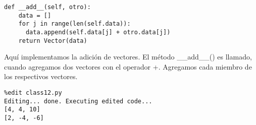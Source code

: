 \documentclass[twoside,10.5pt]{article}%
\begin{document}
\begin{verbatim}
def __add__(self, otro):
    data = []
    for j in range(len(self.data)):
      data.append(self.data[j] + otro.data[j])
    return Vector(data)
\end{verbatim}

Aqu\'i implementamos la adici\'on de vectores. El m\'etodo {\color{blue}\_\_add\_\_()} es llamado, cuando agregamos dos vectores con el operador +. Agregamos cada miembro de los respectivos vectores.


\begin{verbatim}
%edit class12.py
Editing... done. Executing edited code...
[4, 4, 10]
[2, -4, -6]
\end{verbatim}
\end{document}
